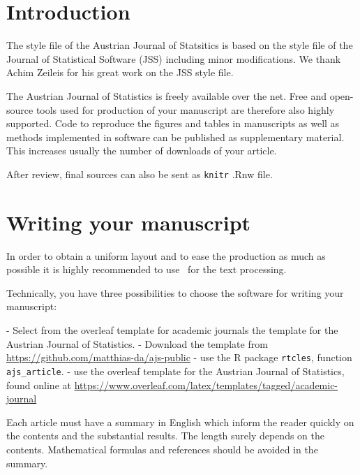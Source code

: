 \documentclass[article]{ajs}
\begin{document}
\section{Introduction}


The style file of the Austrian Journal of Statsitics is based on the style file of the Journal of Statistical Software (JSS) including minor modifications. We thank Achim Zeileis for his great work on the JSS style file.

The Austrian Journal of Statistics is freely available over the net. Free and open-source tools used for production of your manuscript are therefore also highly supported. Code to reproduce the figures and tables in manuscripts as well as methods implemented in software can be published as supplementary material. This increases usually the number of 
downloads of your article.

After review, final sources can also be sent as \texttt{knitr} \citep{knitr} .Rnw file.



\section{Writing your manuscript}

In order to obtain a uniform layout and to ease the production as
much as possible it is highly recommended to use \LaTeXe\ for the
text processing. 


Technically, you have three possibilities to choose the software for writing your manuscript:

- Select from the overleaf template for academic journals the template for the Austrian Journal of Statistics.
- Download the template from \href{https://github.com/matthias-da/ajs-public}{https://github.com/matthias-da/ajs-public}
- use the R package \texttt{rtcles}, function \texttt{ajs\_article}.
- use the overleaf template for the Austrian Journal of Statistics, found online at \href{https://www.overleaf.com/latex/templates/tagged/academic-journal}{https://www.overleaf.com/latex/templates/tagged/academic-journal}



Each article must have a summary in English which
inform the reader quickly on the contents and the substantial
results. The length surely depends on the contents. 
Mathematical formulas and references should be
avoided in the summary.
\end{document}
